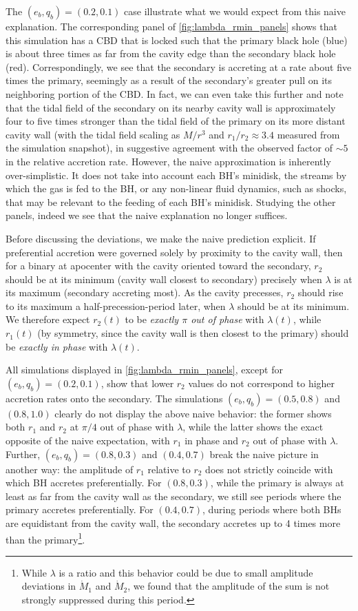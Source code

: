 \documentclass[fleqn,usenatbib]{mnras}
\begin{document}
The $(e_b, q_b) = (0.2, 0.1)$ case illustrate what we would expect from this naive explanation. The corresponding panel of \autoref{fig:lambda_rmin_panels} shows that this simulation has a CBD that is locked such that the primary black hole (blue) is about three times as far from the cavity edge than the secondary black hole (red). Correspondingly, we see that the secondary is accreting at a rate about five times the primary, seemingly as a result of the secondary's greater pull on its neighboring portion of the CBD. In fact, we can even take this further and note that the tidal field of the secondary on its nearby cavity wall is approximately four to five times stronger than the tidal field of the primary on its more distant cavity wall (with the tidal field scaling as $M/r^3$ and $r_1/r_2 \approx 3.4$ measured from the simulation snapshot), in suggestive agreement with the observed factor of $\sim 5$ in the relative accretion rate. However, the naive approximation is inherently over-simplistic. It does not take into account each BH's minidisk, the streams by which the gas is fed to the BH, or any non-linear fluid dynamics, such as shocks, that may be relevant to the feeding of each BH's minidisk. Studying the other panels, indeed we see that the naive explanation no longer suffices.

Before discussing the deviations, we make the naive prediction explicit. If preferential accretion were governed solely by proximity to the cavity wall, then for a binary at apocenter with the cavity oriented toward the secondary, $r_2$ should be at its minimum (cavity wall closest to secondary) precisely when $\lambda$ is at its maximum (secondary accreting most). As the cavity precesses, $r_2$ should rise to its maximum a half-precession-period later, when $\lambda$ should be at its minimum. We therefore expect $r_2(t)$ to be \textit{exactly $\pi$ out of phase} with $\lambda(t)$, while $r_1(t)$ (by symmetry, since the cavity wall is then closest to the primary) should be \textit{exactly in phase} with $\lambda(t)$.

All simulations displayed in \autoref{fig:lambda_rmin_panels}, except for $(e_b, q_b) = (0.2, 0.1)$, show that lower $r_2$ values do not correspond to higher accretion rates onto the secondary. The simulations $(e_b, q_b) = (0.5, 0.8)$ and $(0.8, 1.0)$ clearly do not display the above naive behavior: the former shows both $r_1$ and $r_2$ at $\pi/4$ out of phase with $\lambda$, while the latter shows the exact opposite of the naive expectation, with $r_1$ in phase and $r_2$ out of phase with $\lambda$. Further, $(e_b, q_b) = (0.8, 0.3)$ and $(0.4, 0.7)$ break the naive picture in another way: the amplitude of $r_1$ relative to $r_2$ does not strictly coincide with which BH accretes preferentially. For $(0.8, 0.3)$, while the primary is always at least as far from the cavity wall as the secondary, we still see periods where the primary accretes preferentially. For $(0.4, 0.7)$, during periods where both BHs are equidistant from the cavity wall, the secondary accretes up to 4 times more than the primary\footnote{While $\lambda$ is a ratio and this behavior could be due to small amplitude deviations in $\dot{M}_1$ and $\dot{M}_2$, we found that the amplitude of the sum is not strongly suppressed during this period.}.
\end{document}
